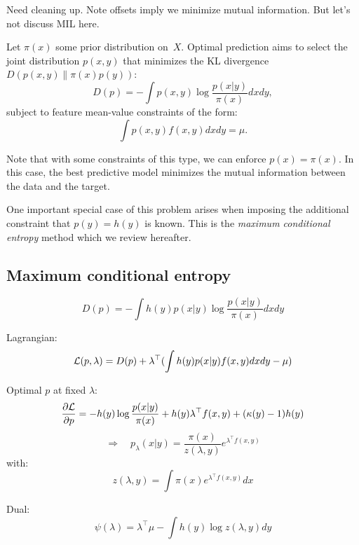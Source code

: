 \documentclass[english]{scrartcl}
\begin{document}
{\color{red} Need cleaning up. Note offsets imply we minimize mutual information. But let's not discuss MIL here.}

Let $\pi(x)$ some prior distribution on~$X$. Optimal prediction aims to select the joint distribution $p(x,y)$ that minimizes the KL divergence $D(p(x,y)\|\pi(x)p(y))$:
$$
D(p) = -\int p(x,y) \log \frac{p(x|y)}{\pi(x)} dx dy,
$$ subject to feature mean-value constraints of the form:
$$
\int p(x,y) f(x,y) dx dy = \mu.
$$

Note that with some constraints of this type, we can enforce $p(x)=\pi(x)$. In this case, the best predictive model minimizes the mutual information between the data and the target.

One important special case of this problem arises when imposing the additional constraint that $p(y)=h(y)$ is known. This is the {\em maximum conditional entropy} method \cite{BergerA-96} which we review hereafter. 






\subsection{Maximum conditional entropy}

$$
D(p) = -\int h(y)p(x|y) \log \frac{p(x|y)}{\pi(x)} dxdy
$$

Lagrangian:
$$
{\cal L}(p,\lambda) = D(p) + \lambda^\top (\int h(y)p(x|y)f(x,y)dxdy - \mu)
$$

Optimal $p$ at fixed $\lambda$:
$$
\frac{\partial{\cal L}}{\partial p}
=
- h(y) \log \frac{p(x|y)}{\pi(x)} + h(y) \lambda^\top f(x,y) + (\kappa(y)-1)h(y)
$$
$$
\Rightarrow
\quad
p_{\lambda}(x|y) = \frac{\pi(x)}{z(\lambda,y)} e^{\lambda^\top f(x,y)}
$$
with:
$$
z(\lambda,y) = \int \pi(x) e^{\lambda^\top f(x,y)} dx
$$

Dual:
$$
\psi(\lambda) = \lambda^\top \mu - \int h(y) \log z(\lambda, y) dy 
$$
\end{document}
